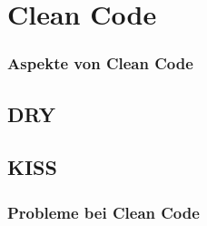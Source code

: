 
\chapter{Clean Code}

\subsection{Aspekte von Clean Code}


\section{DRY}


\section{KISS}


\subsection{Probleme bei Clean Code}

